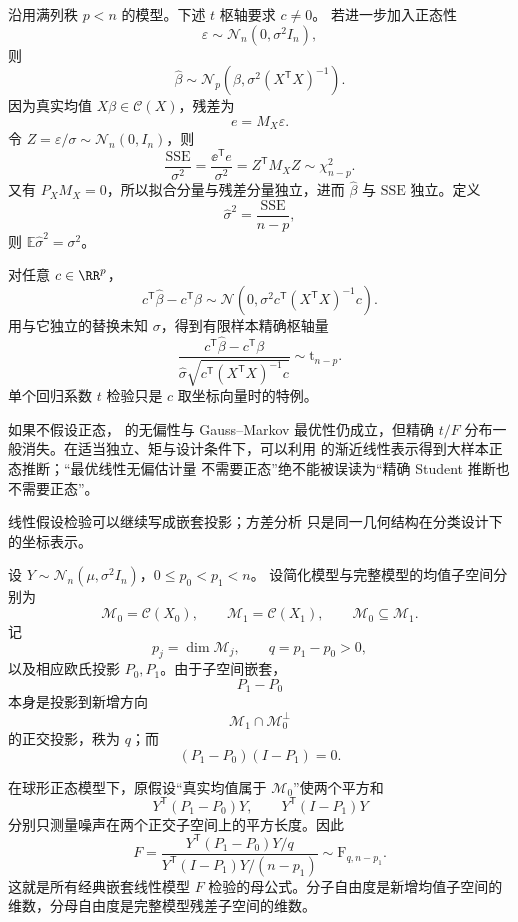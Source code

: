 \begin{theorem}
沿用满列秩 $p<n$ 的模型。下述 $t$ 枢轴要求 $c\ne0$。
若进一步加入正态性
\[
 \varepsilon\sim\mathcal N_n(0,\sigma^2I_n),
\]
则
\[
 \widehat\beta
 \sim\mathcal N_p\!\left(
 \beta,
 \sigma^2(X^{\mathsf T}X)^{-1}
 \right).
\]
因为真实均值 $X\beta\in\mathcal C(X)$，残差为
\[
 e=M_X\varepsilon.
\]
令 $Z=\varepsilon/\sigma\sim\mathcal N_n(0,I_n)$，则
\[
 \frac{\mathrm{SSE}}{\sigma^2}
 =\frac{\ee^{\mathsf T}e}{\sigma^2}
 =Z^{\mathsf T}M_XZ
 \sim\chi^2_{n-p}.
\]
又有 $P_XM_X=0$，所以拟合分量与残差分量独立，进而 $\widehat\beta$ 与 $\mathrm{SSE}$ 独立。定义
\begin{equation}\label{eq:math-stat-linear-model-sigma-hat}
 \widehat\sigma^2
 =\frac{\mathrm{SSE}}{n-p},
\end{equation}
则 $\mathbb E\widehat\sigma^2=\sigma^2$。

对任意 $c\in\RR^p$，
\[
 c^{\mathsf T}\widehat\beta-c^{\mathsf T}\beta
 \sim\mathcal N\!\left(
 0,
 \sigma^2c^{\mathsf T}(X^{\mathsf T}X)^{-1}c
 \right).
\]
用与它独立的替换未知 $\sigma$，得到有限样本精确枢轴量
\begin{equation*}\frac{c^{\mathsf T}\widehat\beta-c^{\mathsf T}\beta}
 {\widehat\sigma
 \sqrt{c^{\mathsf T}(X^{\mathsf T}X)^{-1}c}}
 \sim\mathrm t_{n-p}.
\end{equation*}
单个回归系数 $t$ 检验只是 $c$ 取坐标向量时的特例。

如果不假设正态， 的无偏性与 Gauss--Markov 最优性仍成立，但精确 $t/F$ 分布一般消失。在适当独立、矩与设计条件下，可以利用  的渐近线性表示得到大样本正态推断；“最优线性无偏估计量 不需要正态”绝不能被误读为“精确 Student 推断也不需要正态”。
\end{theorem}

线性假设检验可以继续写成嵌套投影；方差分析 只是同一几何结构在分类设计下的坐标表示。

\begin{theorem}[嵌套正态模型的正交平方和]
设 $Y\sim\mathcal N_n(\mu,\sigma^2I_n)$，$0\le p_0<p_1<n$。
设简化模型与完整模型的均值子空间分别为
\[
 \mathcal M_0=\mathcal C(X_0),
 \qquad
 \mathcal M_1=\mathcal C(X_1),
 \qquad
 \mathcal M_0\subseteq\mathcal M_1.
\]
记
\[
 p_j=\dim\mathcal M_j,
 \qquad
 q=p_1-p_0>0,
\]
以及相应欧氏投影 $P_0,P_1$。由于子空间嵌套，
\[
 P_1-P_0
\]
本身是投影到新增方向
\[
 \mathcal M_1\cap\mathcal M_0^\perp
\]
的正交投影，秩为 $q$；而
\[
 (P_1-P_0)(I-P_1)=0.
\]

在球形正态模型下，原假设“真实均值属于 $\mathcal M_0$”使两个平方和
\[
 Y^{\mathsf T}(P_1-P_0)Y,
 \qquad
 Y^{\mathsf T}(I-P_1)Y
\]
分别只测量噪声在两个正交子空间上的平方长度。因此
\begin{equation}\label{eq:math-stat-general-nested-f-test}
 F
 =\frac{Y^{\mathsf T}(P_1-P_0)Y/q}
 {Y^{\mathsf T}(I-P_1)Y/(n-p_1)}
 \sim\mathrm F_{q,n-p_1}.
\end{equation}
这就是所有经典嵌套线性模型 $F$ 检验的母公式。分子自由度是新增均值子空间的维数，分母自由度是完整模型残差子空间的维数。
\end{theorem}

